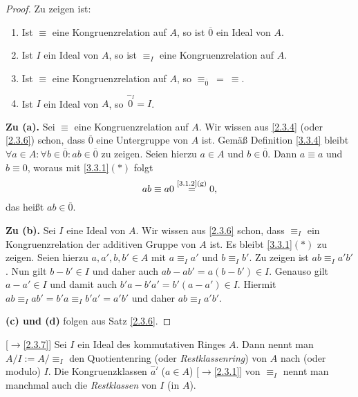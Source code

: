 \documentclass[../../main.tex]{subfiles}
\begin{document}
\begin{proof}
Zu zeigen ist:
\begin{enumerate}[\normalfont(a)]
\item Ist $\equiv$ eine Kongruenzrelation auf $A$, so ist $\overline0$ ein Ideal von $A$.
\item Ist $I$ ein Ideal von $A$, so ist $\equiv_I$ eine Kongruenzrelation auf $A$.
\item Ist $\equiv$ eine Kongruenzrelation auf $A$, so $\equiv_{\overline0}~=~\equiv$.
\item Ist $I$ ein Ideal von $A$, so $\overset{-_I}0=I$.
\end{enumerate}
\medskip\noindent
{\bf Zu (a).} Sei $\equiv$ eine Kongruenzrelation auf $A$. Wir wissen aus \ref{2.3.4} (oder \ref{2.3.6}) schon, dass $\overline 0$ eine Untergruppe von $A$ ist. Gemäß Definition
\ref{3.3.4} bleibt $\forall a\in A:\forall b\in\overline0:ab\in\overline0$ zu zeigen. Seien hierzu $a\in A$ und $b\in\overline0$. Dann $a\equiv a$ und $b\equiv0$, woraus mit
\ref{3.3.1}$(*)$ folgt $$ab\equiv a0\overset{\text{\ref{3.1.2}(g)}}=0,$$das heißt $ab\in\overline0$.

\medskip\noindent
{\bf Zu (b).} Sei $I$ eine Ideal von $A$. Wir wissen aus \ref{2.3.6} schon, dass $\equiv_I$ ein Kongruenzrelation der additiven Gruppe von $A$ ist. Es bleibt \ref{3.3.1}$(*)$ zu zeigen. Seien
hierzu $a,a',b,b'\in A$ mit $a\equiv_Ia'$ und $b\equiv_Ib'$. Zu zeigen ist $ab\equiv_Ia'b'$. Nun gilt $b-b'\in I$ und daher auch $ab-ab'=a(b-b')\in I$. Genauso gilt $a-a'\in I$ und
damit auch $b'a-b'a'=b'(a-a')\in I$. Hiermit $ab\equiv_Iab'=b'a\equiv_Ib'a'=a'b'$ und daher $ab\equiv_Ia'b'$.

\medskip\noindent
{\bf (c) und (d)} folgen aus Satz \ref{2.3.6}.
\end{proof}

\begin{df}{\rm[$\to$\ref{2.3.7}]}\label{3.3.7}
Sei $I$ ein Ideal des kommutativen Ringes $A$. Dann nennt man $A/I:=A/\mbox{$\equiv_I$}$ den Quotientenring (oder \emph{Restklassenring}) von $A$ nach (oder modulo) $I$.
Die Kongruenzklassen $\overset{-_I}{a~}$ ($a\in A$) {\rm[$\to$\ref{2.3.1}]} von $\equiv_I$ nennt man manchmal auch die \emph{Restklassen} von $I$ (in $A$).
\end{df}

\end{document}

